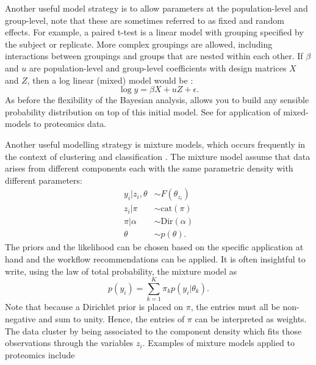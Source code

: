 \documentclass[12pt,english]{article}
\begin{document}
Another useful model strategy is to allow parameters at the population-level and group-level, note that these are sometimes referred to as fixed and random effects. For example, a paired t-test is a linear model with grouping specified by the subject or replicate. More complex groupings are allowed, including interactions between groupings and groups that are nested within each other. If $\beta$ and $u$ are population-level and group-level coefficients with design matrices $X$ and $Z$, then a log linear (mixed) model would be \citep{Bates::2014}:
\begin{equation}
\log y = \beta X + u Z + \epsilon.
\end{equation}
As before the flexibility of the Bayesian analysis, allows you to build any sensible probability distribution on top of this initial model. See \citet{Morris::2008, Morris::2011} for application of mixed-models to proteomics data.

Another useful modelling strategy is mixture models, which occurs frequently in the context of clustering and classification \citep{Mclachlan::2019}. The mixture model assume that data arises from different components each with the same parametric density with different parameters:
\begin{equation}
\begin{split}
y_i|z_i,\theta &\sim F(\theta_{z_i})\\
z_i|\pi & \sim \text{cat}(\pi)\\
\pi|\alpha & \sim \text{Dir}(\alpha)\\
\theta & \sim p(\theta).
\end{split}	
\end{equation}
The priors and the likelihood can be chosen based on the specific application at hand and the workflow recommendations can be applied. It is often insightful to write, using the law of total probability, the mixture model as
\begin{equation}
p(y_i) = \sum_{k = 1}^{K} \pi_k p(y_i|\theta_k).
\end{equation}  
Note that because a Dirichlet prior is placed on $\pi$, the entries must all be non-negative and sum to unity. Hence, the entries of $\pi$ can be interpreted as weights. The data cluster by being associated to the component density which fits those observations through the variables $z_i$. Examples of mixture models applied to proteomics include \citet{Chung::2013, Crook::2018, Crook::2019b}
\end{document}
